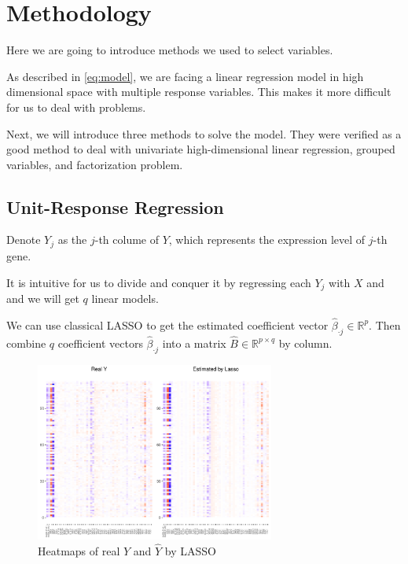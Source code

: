 \section{Methodology}

Here we are going to introduce methods we used to select variables. 

As described in \eqref{eq:model}, we are facing a linear regression model in high dimensional space with multiple response variables. 
This makes it more difficult for us to deal with problems. 

Next, we will introduce three methods to solve the model. 
They were verified as a good method to deal with univariate high-dimensional linear regression, grouped variables, and factorization problem. 

\subsection{Unit-Response Regression}

Denote $Y_j$ as the $j$-th colume of $Y$, which represents the expression level of $j$-th gene. 

It is intuitive for us to divide and conquer it by regressing each $Y_j$ with $X$ and and we will get $q$ linear models. 

We can use classical LASSO \citep{tibshirani1996regression} to get the estimated coefficient vector $\hat{\beta}_{\cdot j} \in \mathbb{R}^{p}$. 
Then combine $q$ coefficient vectors $\hat{\beta}_{\cdot j}$ into a matrix $\widehat{B}\in\mathbb{R}^{p\times q}$ by column. 

\begin{figure}[ht]
    \centering
    \includegraphics[width=0.7\textwidth]{./figs/heatmap_lasso.pdf}
    \caption{Heatmaps of real $Y$ and $\hat{Y}$ by LASSO}
    \label{fig:heatmaplasso}
\end{figure}

